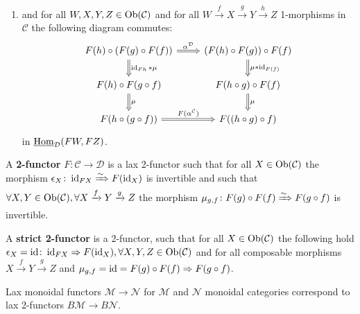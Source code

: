 \begin{defi}
\begin{itemize}
\begin{enumerate}[label=(\alph*)]
				\item 
				and for all $ W , X , Y , Z \in \operatorname{Ob} ( \mathcal{ C } ) $ and for all $ W \xrightarrow{ f } X \xrightarrow{ g } Y \xrightarrow{ h } Z $ 1-morphisms in $ \mathcal{ C } $ the following diagram commutes: 
				\[
				\begin{tikzcd}
					F ( h ) \circ ( F ( g ) \circ F ( f ) )
					\ar[r, Rightarrow, "\alpha^{ \mathcal{ D } }"]
					\ar[d, Rightarrow, " \id_{Fh} * \mu "]
					&
					( F ( h ) \circ F ( g ) ) \circ F ( f )
					\ar[d, Rightarrow, " \mu * \id_{ F ( f ) } "]
					\\
					F ( h ) \circ F ( g \circ f )
					\ar[d , Rightarrow, "\mu "]
					&
					F ( h \circ g ) \circ F ( f )
					\ar[d, Rightarrow, "\mu"]
					\\
					F ( h \circ ( g \circ f ) )
					\ar[r, Rightarrow, " F ( \alpha^{ \mathcal{ C } } ) "]
					&
					F ( ( h \circ g ) \circ f )
				\end{tikzcd}
				\]
				in $ \underline{ \operatorname{Hom} }_{ \mathcal{ D } } ( F W , F Z )$.
 		\end{enumerate}
	\end{itemize}
\end{defi}

\begin{defi}
\label{twofunctor_defi}
	A \textbf{2-functor} $ F \colon \mathcal{ C } \to \mathcal{ D } $ is a lax 2-functor such that for all $ X \in \operatorname{Ob} ( \mathcal{ C } ) $ 
	the morphism $ \epsilon_X \colon \operatorname{id}_{ F X } \xRightarrow{\sim} F ( \operatorname{id}_X )$ is invertible and such that $ \forall X , Y \in \operatorname{Ob} (\mathcal{ C } ), \forall X \xrightarrow{ f } Y \xrightarrow{ g } Z $ the morphism $ \mu_{ g , f } \colon F ( g ) \circ F ( f )
	\xRightarrow{ \sim } F ( g \circ f ) $ is invertible.
\end{defi}

\begin{defi}
\label{strict_twofunctor_defi}
	A \textbf{strict 2-functor} is a 2-functor, such that for all $ X \in \operatorname{Ob} ( \mathcal { C } )$ the following hold $ \epsilon_X = \operatorname{id} \colon \operatorname{id}_{ FX } \Rightarrow F ( \operatorname{id}_X ), \forall X , Y , Z \in \operatorname{Ob} ( \mathcal{ C } )$ and for all composable morphisms $ X \xrightarrow{ f } Y \xrightarrow{ g } Z $ and $ \mu_{ g , f } = \operatorname{id} = F ( g ) \circ F ( f ) \Rightarrow F ( g \circ f ) $.
\end{defi}

\begin{exmp}
	Lax monoidal functors $ \mathcal{ M } \to \mathcal{ N } $ for $ \mathcal{ M } $ and $ \mathcal{ N } $ monoidal categories correspond to lax 2-functors $ B \mathcal{ M } \to B \mathcal{ N } $.
\end{exmp}

